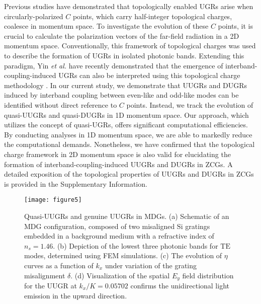 \documentclass[%
 reprint,
superscriptaddress,
 amsmath,amssymb, aps,
]{revtex4-1}
\begin{document}
Previous studies have demonstrated that topologically enabled UGRs arise when circularly-polarized $C$ points, which carry half-integer topological charges, coalesce in momentum space. To investigate the evolution of these $C$ points, it is crucial to calculate the polarization vectors of the far-field radiation in a 2D momentum space. Conventionally, this framework of topological charges was used to describe the formation of UGRs in isolated photonic bands. Extending this paradigm, Yin \emph{et al.} have recently demonstrated that the emergence of interband-coupling-induced UGRs can also be interpreted using this topological charge methodology \cite{XYin2023}. In our current study, we demonstrate that UUGRs and DUGRs induced by interband coupling between even-like and odd-like modes can be identified without direct reference to $C$ points. Instead, we track the evolution of quasi-UUGRs and quasi-DUGRs in 1D momentum space. Our approach, which utilizes the concept of quasi-UGRs, offers significant computational efficiencies. By conducting analyses in 1D momentum space, we are able to markedly reduce the computational demands. Nonetheless, we have confirmed that the topological charge framework in 2D momentum space is also valid for elucidating the formation of interband-coupling-induced UUGRs and DUGRs in ZCGs. A detailed exposition of the topological properties of UUGRs and DUGRs in ZCGs is provided in the Supplementary Information.

\begin{figure*}[]
\centering\texttt{[image: figure5]}
\caption {\label{fig5} Quasi-UUGRs and genuine UUGRs in MDGs. (a) Schematic of an MDG configuration, composed of two misaligned  $\mathrm{Si}$ gratings embedded in a background medium with a refractive index of $n_s=1.46$. (b) Depiction of the lowest three photonic bands for $\mathrm{TE}$ modes, determined using FEM simulations. (c) The evolution of $\eta$ curves as a function of $k_x$ under variation of the grating misalignment $\delta$. (d) Visualization of the spatial $E_y$ field distribution for the UUGR at $k_x/K=0.05702$ confirms the unidirectional light emission in the upward direction.}
\end{figure*}
\end{document}

